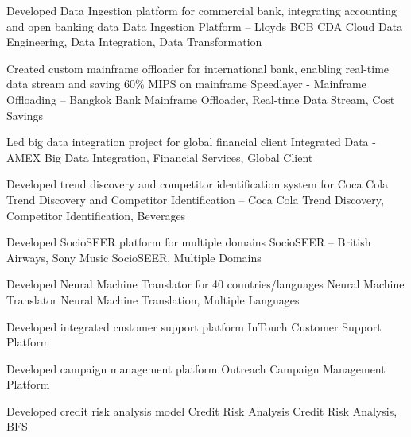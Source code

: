 \documentclass[]{awesome-cv}
\begin{document}
\begin{cventries}
    	\cventry
	{ Developed Data Ingestion platform for commercial bank, integrating accounting and open banking data }
	{ Data Ingestion Platform – Lloyds BCB CDA }
	{        {Cloud Data Engineering, Data Integration, Data Transformation } 
    }
	{}
	{}
	
	\vspace{-5mm}
    	\cventry
	{ Created custom mainframe offloader for international bank, enabling real{-}time data stream and saving 60\% MIPS on mainframe }
	{ Speedlayer {-} Mainframe Offloading – Bangkok Bank }
	{        {Mainframe Offloader, Real{-}time Data Stream, Cost Savings } 
    }
	{}
	{}
	
	\vspace{-5mm}
    	\cventry
	{ Led big data integration project for global financial client }
	{ Integrated Data {-} AMEX }
	{        {Big Data Integration, Financial Services, Global Client } 
    }
	{}
	{}
	
	\vspace{-5mm}
    	\cventry
	{ Developed trend discovery and competitor identification system for Coca Cola }
	{ Trend Discovery and Competitor Identification – Coca Cola }
	{        {Trend Discovery, Competitor Identification, Beverages } 
    }
	{}
	{}
	
	\vspace{-5mm}
    	\cventry
	{ Developed SocioSEER platform for multiple domains }
	{ SocioSEER – British Airways, Sony Music }
	{        {SocioSEER, Multiple Domains } 
    }
	{}
	{}
	
	\vspace{-5mm}
    	\cventry
	{ Developed Neural Machine Translator for 40 countries/languages }
	{ Neural Machine Translator }
	{        {Neural Machine Translation, Multiple Languages } 
    }
	{}
	{}
	
	\vspace{-5mm}
    	\cventry
	{ Developed integrated customer support platform }
	{ InTouch }
	{        {Customer Support Platform } 
    }
	{}
	{}
	
	\vspace{-5mm}
    	\cventry
	{ Developed campaign management platform }
	{ Outreach }
	{        {Campaign Management Platform } 
    }
	{}
	{}
	
	\vspace{-5mm}
    	\cventry
	{ Developed credit risk analysis model }
	{ Credit Risk Analysis }
	{        {Credit Risk Analysis, BFS } 
    }
	{}
	{}
	
	\vspace{-5mm}
    \end{cventries}
\end{document}
